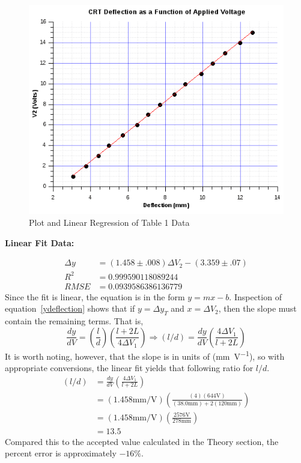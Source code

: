 \documentclass[twocolumn,english]{IEEEtran}
\theoremstyle{plain}
\theoremstyle{plain}
\begin{document}
  \begin{figure}[htbp]
   \begin{centering}
   \begin{center}
   \includegraphics[keepaspectratio=true, width=\linewidth]{./CRTLab.png}
   \caption{Plot and Linear Regression of Table 1 Data}
   \end{center}
   \par\end{centering}
  \end{figure}

   \textbf{Linear Fit Data:}

  \begin{align*}
  \Delta y & =(1.458 \pm .008)\Delta V_2 - (3.359 \pm .07) \\
  R^2 & = 0.999590118089244 \\
  RMSE & = 0.0939586386136779
  \end{align*}
  Since the fit is linear, the equation is in the form $y=mx-b$.
  Inspection of equation~\ref{ydeflection} shows that if $y=\Delta y_T$ and $x=\Delta V_2$, then the slope must contain the remaining terms. That is,
  \begin{equation*}
  \frac{dy}{dV} = (\frac{l}{d})(\frac{l+2L}{4\Delta V_1})
  \Rightarrow (l/d) = \frac{dy}{dV}(\frac{4\Delta V_1}{l + 2L})
  \end{equation*}
  It is worth noting, however, that the slope is in units of (\si{\milli\metre\per\volt}), so with appropriate conversions, the linear fit yields that following ratio for $l/d$.
  \begin{align*}
    (l/d) &= \frac{dy}{dV}(\frac{4\Delta V_1}{l + 2L}) \\
	  &= (1.458\si{\milli\metre\per\volt})
	     \left(\frac{ (4)(644\si{\volt}) }{(38.0\si{\milli\metre})+2(120\si{\milli\metre})}\right)\\
	  &= (1.458\si{\milli\metre\per\volt})(\frac{2576\si{\volt}}{278\si{\milli\metre}})\\
	  &= 13.5
  \end{align*}
  Compared this to the accepted value calculated in the Theory section, the percent error is approximately $-16\%$.
\end{document}
